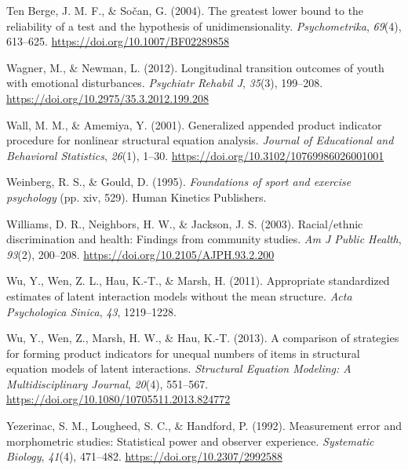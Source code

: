 \documentclass[
  man]{apa7}
\newlength{\cslhangindent}
\newlength{\cslentryspacingunit} %
\newenvironment{CSLReferences}[2] %
 {%
  \setlength{\parindent}{0pt}
  \ifodd #1
  \let\oldpar\par
  \def\par{\hangindent=\cslhangindent\oldpar}
  \fi
  \setlength{\parskip}{#2\cslentryspacingunit}
 }%
 {}
\begin{document}
\begin{CSLReferences}{1}{0}
\leavevmode{}%
Ten Berge, J. M. F., \& Sočan, G. (2004). The greatest lower bound to the reliability of a test and the hypothesis of unidimensionality. \emph{Psychometrika}, \emph{69}(4), 613--625. \url{https://doi.org/10.1007/BF02289858}

\leavevmode{}%
Wagner, M., \& Newman, L. (2012). Longitudinal transition outcomes of youth with emotional disturbances. \emph{Psychiatr Rehabil J}, \emph{35}(3), 199--208. \url{https://doi.org/10.2975/35.3.2012.199.208}

\leavevmode{}%
Wall, M. M., \& Amemiya, Y. (2001). Generalized appended product indicator procedure for nonlinear structural equation analysis. \emph{Journal of Educational and Behavioral Statistics}, \emph{26}(1), 1--30. \url{https://doi.org/10.3102/10769986026001001}

\leavevmode{}%
Weinberg, R. S., \& Gould, D. (1995). \emph{Foundations of sport and exercise psychology} (pp. xiv, 529). Human Kinetics Publishers.

\leavevmode{}%
Williams, D. R., Neighbors, H. W., \& Jackson, J. S. (2003). Racial/ethnic discrimination and health: {Findings} from community studies. \emph{Am J Public Health}, \emph{93}(2), 200--208. \url{https://doi.org/10.2105/AJPH.93.2.200}

\leavevmode{}%
Wu, Y., Wen, Z. L., Hau, K.-T., \& Marsh, H. (2011). Appropriate standardized estimates of latent interaction models without the mean structure. \emph{Acta Psychologica Sinica}, \emph{43}, 1219--1228.

\leavevmode{}%
Wu, Y., Wen, Z., Marsh, H. W., \& Hau, K.-T. (2013). A comparison of strategies for forming product indicators for unequal numbers of items in structural equation models of latent interactions. \emph{Structural Equation Modeling: A Multidisciplinary Journal}, \emph{20}(4), 551--567. \url{https://doi.org/10.1080/10705511.2013.824772}

\leavevmode{}%
Yezerinac, S. M., Lougheed, S. C., \& Handford, P. (1992). Measurement error and morphometric studies: {Statistical} power and observer experience. \emph{Systematic Biology}, \emph{41}(4), 471--482. \url{https://doi.org/10.2307/2992588}

\end{CSLReferences}
\end{document}
